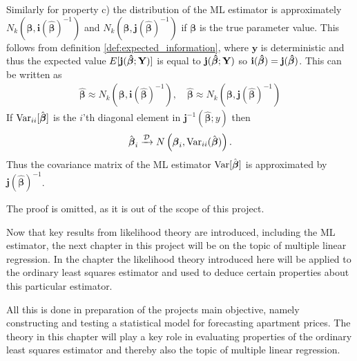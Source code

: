 Similarly for property c) the distribution of the ML estimator is approximately $N_k(\boldsymbol{\beta}, \textbf{i}(\hat{\boldsymbol{\beta}})^{-1})$ and $N_k(\boldsymbol{\beta}, \textbf{j}(\hat{\boldsymbol{\beta}})^{-1})$ if $\boldsymbol{\beta}$ is the true parameter value. This follows from definition \ref{def:expected_information}, where $\textbf{y}$ is deterministic and thus the expected value $E[\textbf{j}(\operatorname{\boldsymbol{\hat{\beta}}} ; \textbf{Y})]$ is equal to $\textbf{j}(\operatorname{\boldsymbol{\hat{\beta}}}; \textbf{Y})$ so $\textbf{i}(\operatorname{\boldsymbol{\hat{\beta}}}) = \textbf{j}(\operatorname{\boldsymbol{\hat{\beta}}})$. This can be written as
\begin{align*}
    \hat{\boldsymbol{\beta}} \approx N_k(\boldsymbol{\beta}, \textbf{i}(\hat{\boldsymbol{\beta}})^{-1}), \quad \hat{\boldsymbol{\beta}} \approx N_k(\boldsymbol{\beta}, \textbf{j}(\hat{\boldsymbol{\beta}})^{-1})
\end{align*}
If $\operatorname{\text{Var}}_{ii}[\hat{\boldsymbol{\beta}}]$ is the $i$'th diagonal element in $\textbf{j}^{-1}(\hat{\boldsymbol{\beta}};y)$ then
\begin{align*}
    \hat{\boldsymbol{\beta}}_i \xrightarrow{\mathcal{D}} N\left( \boldsymbol{\beta}_i, \operatorname{\text{Var}}_{ii}(\hat{\boldsymbol{\beta}}) \right).
\end{align*}
Thus the covariance matrix of the ML estimator $\operatorname{\text{Var}}[\hat{\boldsymbol{\beta}}]$ is approximated by $\textbf{j}(\hat{\boldsymbol{\beta}})^{-1}$.

The proof is omitted, as it is out of the scope of this project. 

Now that key results from likelihood theory are introduced, including the ML estimator, the next chapter in this project will be on the topic of multiple linear regression.
In the chapter the likelihood theory introduced here will be applied to the ordinary least squares estimator and used to deduce certain properties about this particular estimator.

All this is done in preparation of the projects main objective, namely constructing and testing a statistical model for forecasting apartment prices.
The theory in this chapter will play a key role in evaluating properties of the ordinary least squares estimator and thereby also the topic of multiple linear regression.